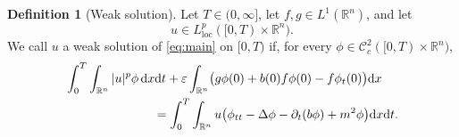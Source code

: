 \documentclass[11pt,reqno]{amsart}
\theoremstyle{definition}
\newtheorem{definition}[theorem]{Definition}
\theoremstyle{remark}
\begin{document}
	\begin{definition}[Weak solution]
		\label{def:weak}
		Let $T\in(0,\infty]$, let $f,g\in L^1(\mathbb{R}^n)$, and let
		$$
		u\in L^p_{\mathrm{loc}}([0,T)\times\mathbb{R}^n).
		$$
		We call $u$ a weak solution of \eqref{eq:main} on $[0,T)$ if, for every
		$\phi\in \mathcal{C}_c^2([0,T)\times\mathbb{R}^n)$,
		\begin{align}
			\label{eq:weak}
			&\int_0^T\int_{\mathbb{R}^n}|u|^p\phi\,\mathrm{d}x\mathrm{d}t
			+\varepsilon\int_{\mathbb{R}^n}
			\bigl(g\phi(0)+b(0)f\phi(0)-f\phi_t(0)\bigr)\mathrm{d}x
			\notag\\
			&\hspace{2.5cm}
			=\int_0^T\int_{\mathbb{R}^n}u
			\bigl(\phi_{tt}-\Delta\phi-\partial_t(b\phi)+m^2\phi\bigr)
			\mathrm{d}x\mathrm{d}t.
		\end{align}
	\end{definition}
	
\end{document}
